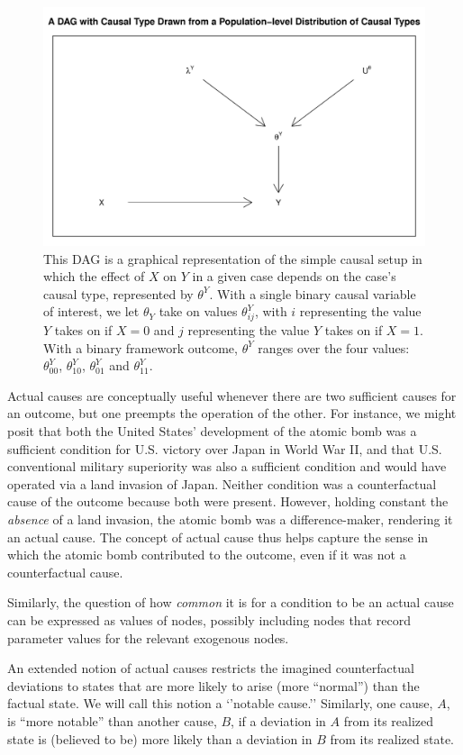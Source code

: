 \documentclass[12pt,]{book}
\begin{document}
\begin{figure}

{\centering \includegraphics[width=.5\textwidth]{ii_files/figure-latex/unnamed-chunk-15-1} 

}

\caption{\label{fig:actualquery} This DAG is a graphical representation of the simple causal setup in which the effect of $X$ on $Y$ in a given case depends on the case's causal type, represented by $\theta^Y$. With a single binary causal variable of interest, we let $\theta_Y$ take on values $\theta^Y_{ij}$, with $i$ representing the value $Y$ takes on if $X=0$ and $j$ representing the value $Y$ takes on if $X=1$. With a binary framework outcome, $\theta^Y$ ranges over the four values: $\theta^Y_{00}$, $\theta^Y_{10}$, $\theta^Y_{01}$ and $\theta^Y_{11}$.}\label{fig:unnamed-chunk-15}
\end{figure}

Actual causes are conceptually useful whenever there are two sufficient causes for an outcome, but one preempts the operation of the other. For instance, we might posit that both the United States' development of the atomic bomb was a sufficient condition for U.S. victory over Japan in World War II, and that U.S. conventional military superiority was also a sufficient condition and would have operated via a land invasion of Japan. Neither condition was a counterfactual cause of the outcome because both were present. However, holding constant the \emph{absence} of a land invasion, the atomic bomb was a difference-maker, rendering it an actual cause. The concept of actual cause thus helps capture the sense in which the atomic bomb contributed to the outcome, even if it was not a counterfactual cause.

Similarly, the question of how \emph{common} it is for a condition to be an actual cause can be expressed as values of nodes, possibly including nodes that record parameter values for the relevant exogenous nodes.

An extended notion \citep[p 81]{halpern2016actual} of actual causes restricts the imagined counterfactual deviations to states that are more likely to arise (more ``normal'') than the factual state. We will call this notion a `'notable cause.'' Similarly, one cause, \(A\), is ``more notable'' than another cause, \(B\), if a deviation in \(A\) from its realized state is (believed to be) more likely than a deviation in \(B\) from its realized state.
\end{document}
